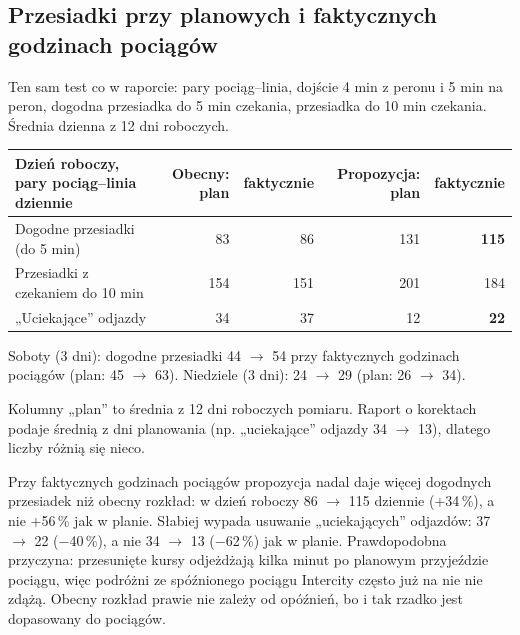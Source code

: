 \documentclass[10pt,a4paper]{article}
\newcommand{\mut}[1]{\textcolor{muted}{#1}}
\begin{document}
\subsection*{Przesiadki przy planowych i faktycznych godzinach pociągów}
Ten sam test co w raporcie: pary pociąg--linia, dojście 4 min z peronu i 5 min na peron, dogodna przesiadka do 5 min czekania, przesiadka do 10 min czekania. Średnia dzienna z 12 dni roboczych.
{\small
\begin{center}\begin{tabular}{@{}l r r r r@{}}\toprule
Dzień roboczy, pary pociąg--linia dziennie & Obecny: plan & faktycznie & Propozycja: plan & faktycznie \\ \midrule
Dogodne przesiadki (do 5 min) & 83 & 86 & 131 & \textbf{115} \\
Przesiadki z czekaniem do 10 min & 154 & 151 & 201 & 184 \\
„Uciekające” odjazdy & 34 & 37 & 12 & \textbf{22} \\
\bottomrule\end{tabular}\end{center}}
\mut{\footnotesize Soboty (3 dni): dogodne przesiadki 44 $\to$ 54 przy faktycznych godzinach pociągów (plan: 45 $\to$ 63). Niedziele (3 dni): 24 $\to$ 29 (plan: 26 $\to$ 34).}

\mut{\footnotesize Kolumny „plan” to średnia z 12 dni roboczych pomiaru. Raport o korektach podaje średnią z dni planowania (np. „uciekające” odjazdy 34 $\to$ 13), dlatego liczby różnią się nieco.}

Przy faktycznych godzinach pociągów propozycja nadal daje więcej dogodnych przesiadek niż obecny rozkład: w dzień roboczy 86 $\to$ 115 dziennie (+34\,\%), a nie +56\,\% jak w planie. Słabiej wypada usuwanie „uciekających” odjazdów: 37 $\to$ 22 ($-$40\,\%), a nie 34 $\to$ 13 ($-$62\,\%) jak w planie. Prawdopodobna przyczyna: przesunięte kursy odjeżdżają kilka minut po planowym przyjeździe pociągu, więc podróżni ze spóźnionego pociągu Intercity często już na nie nie zdążą. Obecny rozkład prawie nie zależy od opóźnień, bo i tak rzadko jest dopasowany do pociągów.
\end{document}

